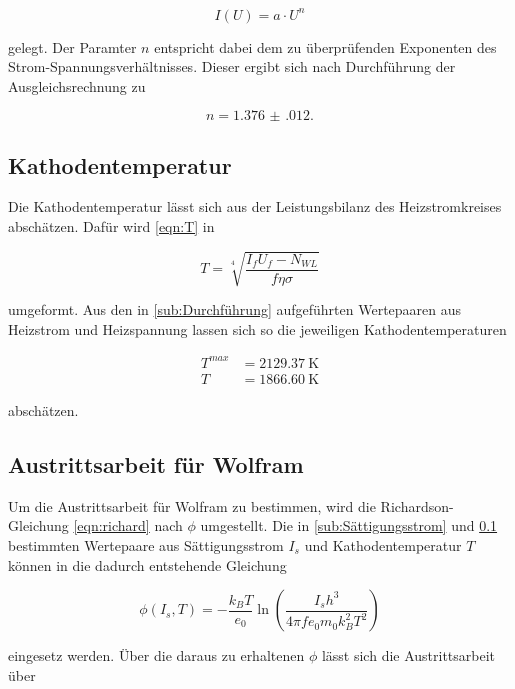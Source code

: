 \begin{equation}
    I(U)=a\cdot U^n
\end{equation}

gelegt. 
Der Paramter $n$ entspricht dabei dem zu überprüfenden Exponenten des Strom-Spannungsverhältnisses.
Dieser ergibt sich nach Durchführung der Ausgleichsrechnung zu 

\begin{equation*}
    n=\num{1.376(012)}.
\end{equation*}



\subsection{Kathodentemperatur}
\label{sub:Kathodentemperatur}

Die Kathodentemperatur lässt sich aus der Leistungsbilanz des Heizstromkreises abschätzen. Dafür wird \eqref{eqn:T} in

\begin{equation}
    T=\sqrt[4]{\frac{I_fU_f-N_{WL}}{f\eta \sigma}}
\end{equation}

umgeformt. Aus den in \ref{sub:Durchführung} aufgeführten Wertepaaren aus Heizstrom und Heizspannung lassen sich so die jeweiligen Kathodentemperaturen

\begin{align*}
T^{max}&=\SI{2129.37}{\kelvin} \\
T&=\SI{1866.60}{\kelvin}
\end{align*}

abschätzen.


\subsection{Austrittsarbeit für Wolfram}

Um die Austrittsarbeit für Wolfram zu bestimmen, wird die Richardson-Gleichung \eqref{eqn:richard} nach $\phi$ umgestellt.
Die in \ref{sub:Sättigungsstrom} und  \ref{sub:Kathodentemperatur} bestimmten Wertepaare aus Sättigungsstrom $I_s$ und Kathodentemperatur $T$ können in die dadurch entstehende Gleichung

\begin{equation}
    \phi(I_s,T)=-\frac{k_BT}{e_0}\ln\left(\frac{I_sh^3}{4\pi f e_0 m_0 k_B^2 T^2}\right)
\end{equation} 

eingesetz werden. Über die daraus zu erhaltenen $\phi$ lässt sich die Austrittsarbeit über

